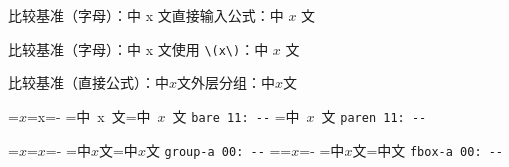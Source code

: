 \documentclass{article}
\begin{document}
比较基准（字母）：中 x 文\quad 直接输入公式：中 $x$ 文

比较基准（字母）：中 x 文\quad 使用 \verb|\(x\)|：中 \(x\) 文

比较基准（直接公式）：中$x$文\quad 外层分组：中{$x$}文

\medskip
{}=\hbox{$x$}=\hbox{x}=\dimexpr{}-\relax
{}=\hbox{中 x 文}=\hbox{中 $x$ 文}
\texttt{bare 11: \the\dimexpr{}--\relax}\quad
{}=\hbox{中 \(x\) 文}
\texttt{paren 11: \the\dimexpr{}--\relax}

=\hbox{{$x$}}=\hbox{$x$}=\dimexpr{}-\relax
{}=\hbox{中$x$文}=\hbox{中{$x$}文}
\texttt{group-a 00: \the\dimexpr{}--\relax}\quad
{}=\hbox{}=\hbox{$x$}=\dimexpr{}-\relax
{}=\hbox{中$x$文}=\hbox{中文}
\texttt{fbox-a 00: \the\dimexpr{}--\relax}
\end{document}
